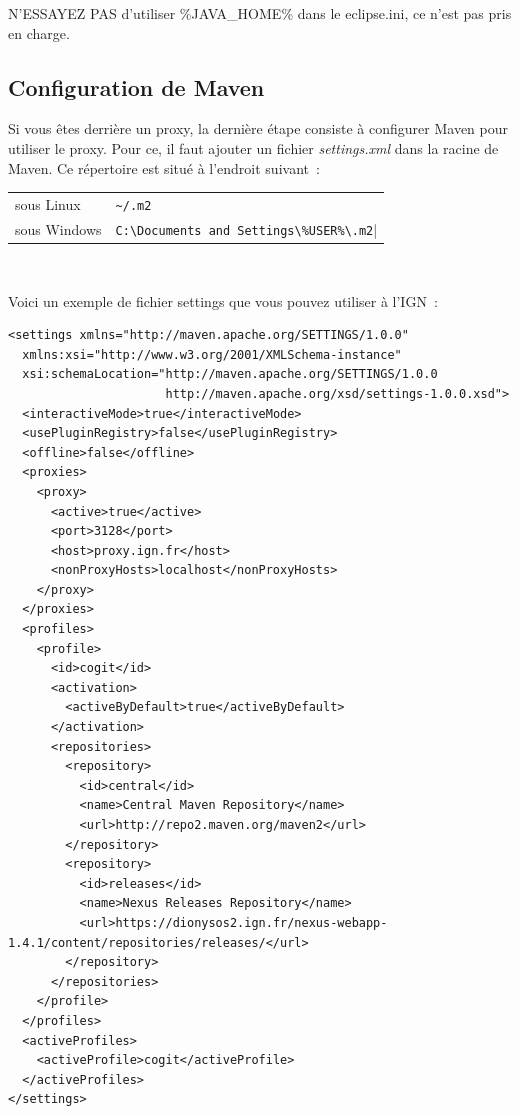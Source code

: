 \medskip 
\noindent
N'ESSAYEZ PAS d'utiliser \%JAVA\_HOME\% dans le eclipse.ini, ce n'est pas pris en charge.


\subsection{Configuration de Maven}
Si vous \^etes derrière un proxy, la dernière étape consiste à configurer Maven pour utiliser le proxy. Pour ce, il faut ajouter un fichier \emph{settings.xml} dans la racine de Maven. Ce répertoire est situé à l'endroit suivant~:\\

\smallskip 

\begin{tabular}[!t]{ll}
sous Linux&\verb|~/.m2|\\
sous Windows&\verb|C:\Documents and Settings\%USER%\.m2|
\end{tabular}\\

\bigskip 

\noindent
Voici un exemple de fichier settings que vous pouvez utiliser à l'IGN~:
\begin{scriptsize}
\begin{verbatim}
<settings xmlns="http://maven.apache.org/SETTINGS/1.0.0"
  xmlns:xsi="http://www.w3.org/2001/XMLSchema-instance"
  xsi:schemaLocation="http://maven.apache.org/SETTINGS/1.0.0
                      http://maven.apache.org/xsd/settings-1.0.0.xsd">
  <interactiveMode>true</interactiveMode>
  <usePluginRegistry>false</usePluginRegistry>
  <offline>false</offline>
  <proxies>
    <proxy>
      <active>true</active>
      <port>3128</port>
      <host>proxy.ign.fr</host>
      <nonProxyHosts>localhost</nonProxyHosts>
    </proxy>
  </proxies>
  <profiles>
    <profile>
      <id>cogit</id>
      <activation>
        <activeByDefault>true</activeByDefault>
      </activation>
      <repositories>
        <repository>
          <id>central</id>
          <name>Central Maven Repository</name>
          <url>http://repo2.maven.org/maven2</url>
        </repository>
        <repository>
          <id>releases</id>
          <name>Nexus Releases Repository</name>
          <url>https://dionysos2.ign.fr/nexus-webapp-1.4.1/content/repositories/releases/</url>
        </repository>
      </repositories>
    </profile>
  </profiles>
  <activeProfiles>
    <activeProfile>cogit</activeProfile>
  </activeProfiles>
</settings>
\end{verbatim}
\end{scriptsize}




